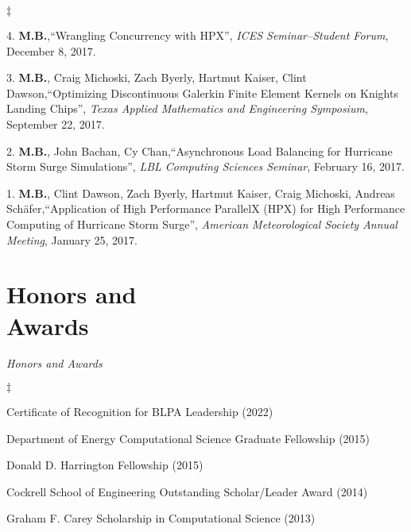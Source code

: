 \documentclass[margin,line]{res}
\newenvironment{list2}{
  \begin{list}{$\ddagger$}{%
      \setlength{\itemsep}{0in}
      \setlength{\parsep}{0in} \setlength{\parskip}{0in}
      \setlength{\topsep}{0in} \setlength{\partopsep}{0in}
      \setlength{\leftmargin}{0.2in}}}{\end{list}}
\newcommand{\talk}[4]{%
#1,``#2'', {\it #3}, #4.%
}
\begin{document}
\begin{resume}
\begin{list2}
\item[4.] \talk{{\bf M.B.}}{Wrangling Concurrency with HPX}{ICES Seminar--Student Forum}{December 8, 2017}

\item[3.] \talk{{\bf M.B.}, Craig Michoski, Zach Byerly, Hartmut Kaiser, Clint Dawson}{Optimizing Discontinuous Galerkin Finite Element Kernels on Knights Landing Chips}{Texas Applied Mathematics and Engineering Symposium}{September 22, 2017}

\item[2.] \talk{{\bf M.B.}, John Bachan, Cy Chan}{Asynchronous Load Balancing for Hurricane Storm Surge Simulations}{LBL Computing Sciences Seminar}{February 16, 2017}

\item[1.] \talk{{\bf M.B.}, Clint Dawson, Zach Byerly, Hartmut Kaiser, Craig Michoski, Andreas Sch\"afer}{Application of High Performance ParallelX (HPX) for High Performance Computing of Hurricane Storm Surge}{American Meteorological Society Annual Meeting}{January 25, 2017}
\end{list2}

\section{\sc Honors and \\ Awards}

\textit{Honors and Awards}
\vspace{0.05in}
\begin{list2}
\item[] Certificate of Recognition for BLPA Leadership (2022)
\item[] Department of Energy Computational Science Graduate Fellowship (2015)
\item[] Donald D. Harrington Fellowship (2015)
\item[] Cockrell School of Engineering Outstanding Scholar/Leader Award (2014)
\item[] Graham F. Carey Scholarship in Computational Science (2013)
\end{list2}






\end{resume}
\end{document}
